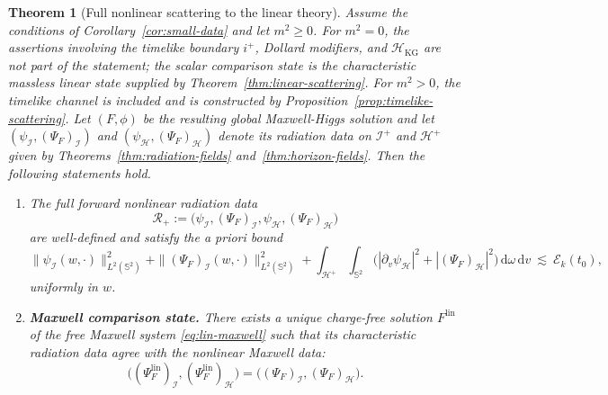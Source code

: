 \documentclass[11pt]{article}
\numberwithin{equation}{section}
\theoremstyle{plain}
\newtheorem{theorem}{Theorem}[section]
\theoremstyle{definition}
\theoremstyle{remark}
\newcommand{\dd}{\mathrm{d}}
\begin{document}
\begin{theorem}[Full nonlinear scattering to the linear theory]\label{thm:nonlinear-scattering}
Assume the conditions of Corollary~\ref{cor:small-data} and let $m^{2}\ge 0$.
For $m^{2}=0$, the assertions involving the timelike boundary $i^{+}$, Dollard modifiers, and $\mathcal H_{\mathrm{KG}}$ are not part of the statement; the scalar comparison state is the characteristic massless linear state supplied by Theorem~\ref{thm:linear-scattering}.  For $m^{2}>0$, the timelike channel is included and is constructed by Proposition~\ref{prop:timelike-scattering}.
Let $(F,\phi)$ be the resulting global Maxwell-Higgs solution and let $(\psi_{\mathcal I},(\Psi_F)_{\mathcal I})$ and $(\psi_{\mathcal H},(\Psi_F)_{\mathcal H})$ denote its radiation data on $\mathcal I^{+}$ and $\mathcal H^{+}$ given by Theorems~\ref{thm:radiation-fields} and~\ref{thm:horizon-fields}.
Then the following statements hold.
\begin{enumerate}
\item[(i)] The full forward nonlinear radiation data
\begin{equation}
\mathcal R_{+}
:=
\bigl(\psi_{\mathcal I},(\Psi_F)_{\mathcal I},\psi_{\mathcal H},(\Psi_F)_{\mathcal H}\bigr)
\end{equation}
are well-defined and satisfy the a priori bound
\begin{equation}
\|\psi_{\mathcal I}(w,\cdot)\|_{L^2(\mathbb S^2)}^{2}
+\|(\Psi_F)_{\mathcal I}(w,\cdot)\|_{L^2(\mathbb S^2)}^{2}
+
\int_{\mathcal H^{+}}\!\!\int_{\mathbb S^2}\bigl(|\partial_v\psi_{\mathcal H}|^{2}+|(\Psi_F)_{\mathcal H}|^{2}\bigr)\,\dd\omega\,\dd v
\ \lesssim\ \mathcal E_k(t_0),
\end{equation}
uniformly in $w$.

\item[(ii)] \textbf{Maxwell comparison state.}
There exists a unique charge-free solution $F^{\mathrm{lin}}$ of the free Maxwell system \eqref{eq:lin-maxwell} such that its characteristic radiation data agree with the nonlinear Maxwell data:
\begin{equation}
\bigl((\Psi_F^{\mathrm{lin}})_{\mathcal I},(\Psi_F^{\mathrm{lin}})_{\mathcal H}\bigr)
=
\bigl((\Psi_F)_{\mathcal I},(\Psi_F)_{\mathcal H}\bigr).
\end{equation}


\end{enumerate}
\end{theorem}
\end{document}
